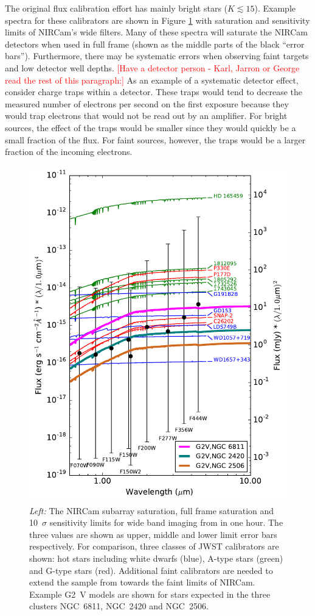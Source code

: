 \documentclass{aastex6}
\begin{document}
The original flux calibration effort has mainly bright stars ($K \lesssim 15$).
Example spectra for these calibrators are shown in Figure \ref{fig:JWStcalsWideF} with saturation and sensitivity limits of NIRCam's wide filters.
Many of these spectra will saturate the NIRCam detectors when used in full frame (shown as the middle parts of the black ``error bars'').
Furthermore, there may be systematic errors when observing faint targets and low detector well depths.
\textcolor{red}{[Have a detector person - Karl, Jarron or George read the rest of this paragraph:]}
As an example of a systematic detector effect, consider charge traps within a detector.
These traps would tend to decrease the measured number of electrons per second on the first exposure because they would trap electrons  that would not be read out by an amplifier.
For bright sources, the effect of the traps would be smaller since they would quickly be a small fraction of the flux.
For faint sources, however, the traps would be a larger fraction of the incoming electrons.

\begin{figure}[!hbtp]
\centering
\includegraphics[width=.48\columnwidth]{calspec_and_new_clust.pdf}
\caption{{\it Left:} The NIRCam subarray saturation, full frame saturation and 10~$\sigma$ sensitivity limits for wide band imaging from \citet{gordon2011fluxplan2} in one hour. The three values are shown as upper, middle and lower limit error bars respectively. For comparison, three classes of JWST calibrators are shown: hot stars including white dwarfs (blue), A-type stars (green) and G-type stars (red).
Additional faint calibrators are needed to extend the sample from \citet{gordon2011fluxplan2} towards the faint limits of NIRCam.
Example G2~V \citet{castelli2004models} models are shown for stars expected in the three clusters NGC~6811, NGC~2420 and NGC~2506.
}\label{fig:JWStcalsWideF}
\end{figure}
\end{document}
